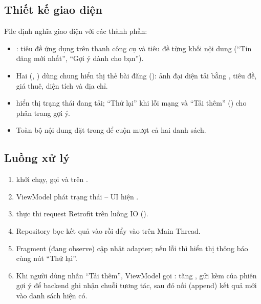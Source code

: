 \subsection{Thiết kế giao diện}
File  định nghĩa giao diện với các thành phần:
\begin{itemize}
    \item {}: tiêu đề ứng dụng trên thanh công cụ và tiêu đề từng
    khối nội dung (``Tin đăng mới nhất'', ``Gợi ý dành cho bạn'').
    \item Hai  (, )
    dùng chung  hiển thị thẻ bài đăng
    (): ảnh đại diện tải bằng , tiêu đề,
    giá thuê, diện tích và địa chỉ.
    \item {} hiển thị trạng thái đang tải;
     ``Thử lại'' khi lỗi mạng và ``Tải thêm''
    () cho phân trang gợi ý.
    \item Toàn bộ nội dung đặt trong  để cuộn mượt cả
    hai danh sách.
\end{itemize}


\subsection{Luồng xử lý}
\begin{enumerate}
    \item {} khởi chạy, gọi  và
     trên .
    \item ViewModel phát trạng thái  -- UI hiện
    .
    \item {} thực thi request Retrofit trên luồng IO
    ().
    \item Repository bọc kết quả vào  rồi đẩy vào
     trên Main Thread.
    \item Fragment (đang observe) cập nhật adapter; nếu lỗi thì hiển thị thông
    báo cùng nút ``Thử lại''.
    \item Khi người dùng nhấn ``Tải thêm'', ViewModel gọi
    : tăng , gửi kèm
     của phiên gợi ý để backend ghi nhận chuỗi
    tương tác, sau đó nối (append) kết quả mới vào danh sách hiện có.
\end{enumerate}

